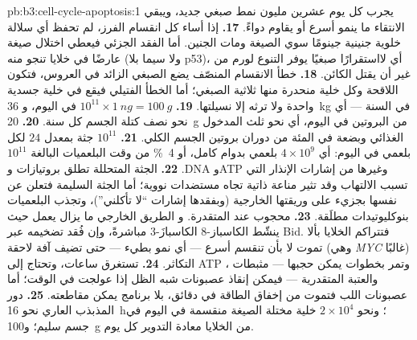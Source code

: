 \begin{solution}{pb:b3:cell-cycle-apoptosis:1}
يجرب كل يوم عشرين مليون نمط صبغي جديد، ويبقي الانتقاء
ما ينمو أسرع أو يقاوم دواءً.
\textbf{17.} إذا أساء كل انقسام الفرز، لم تحفظ أي سلالة
خلوية جنينية جينومًا سوي الصيغة ومات الجنين. أما الفقد الجزئي فيعطي
اختلال صيغة عارضًا في خلايا تنجو منه (ولا سيما بلا
p53)، أي لااستقرارًا صبغيًا يوفر التنوع لورم
من غير أن يقتل الكائن.
\textbf{18.} خطأ الانقسام المنصّف يضع الصبغي الزائد في العروس،
فتكون اللاقحة وكل خلية منحدرة منها ثلاثية الصبغي؛ أما الخطأ
الفتيلي فيقع في خلية جسدية واحدة ولا ترثه إلا نسيلتها.
\textbf{19.} $10^{11}\times \qty{1}{ng} = \qty{100}{g}$ في اليوم، و
\qty{36}{kg} في السنة --- أي نحو نصف كتلة الجسم كل سنة.
\textbf{20.} \qty{20}{g} من البروتين في اليوم، أي نحو ثلث المدخول
الغذائي وبضعة في المئة من دوران بروتين الجسم الكلي.
\textbf{21.} $10^{11}$ جثة بمعدل $24$ لكل بلعمي في اليوم: أي $4\times
10^{9}$ بلعمي بدوام كامل، أو \qty{4}{\%} من وقت البلعميات البالغة
$10^{11}$.
\textbf{22.} الجثة المتحللة تطلق بروتيازات وDNA وATP وغيرها من
إشارات الإنذار التي تسبب الالتهاب وقد تثير مناعة ذاتية
تجاه مستضدات نووية؛ أما الجثة السليمة فتعلن عن نفسها بجزيء
 على وريقتها الخارجية (وبفقدها إشارات ``لا تأكلني'')،
وتجذب البلعميات بنوكليوتيدات مطلَقة.
\textbf{23.}  محجوب عند المتقدرة. و
الطريق الخارجي ما يزال يعمل حيث ينشّط الكاسباز-8 الكاسبازَ-3
مباشرةً، وإن فُقد تضخيمه عبر Bid. فتتراكم الخلايا
بألا تموت لا بأن تنقسم أسرع --- أي نمو بطيء
--- حتى تضيف آفة لاحقة (وهي \emph{MYC} غالبًا) التكاثر.
\textbf{24.}  تستغرق ساعات، وتحتاج إلى ATP وتمر
بخطوات يمكن حجبها --- مثبطات ، والعتبة
المتقدرية --- فيمكن إنقاذ عصبونات شبه الظل إذا عولجت في الوقت؛
أما عصبونات اللب فتموت من إخفاق الطاقة في دقائق، بلا برنامج
يمكن مقاطعته.
\textbf{25.} دور المذبذب العاري نحو \qty{16}{h}؛ ونحو $2\times
10^{4}$ خلية مختلة الصيغة منقسمة في اليوم في جسم سليم؛ و\qty{100}{g}
من الخلايا معادة التدوير  كل يوم.
\end{solution}
